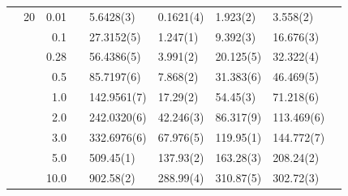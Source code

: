 \begin{table}[H]
\begin{tabularx}{\textwidth}{R{1cm}rrcR{2.3cm}R{2.3cm}R{2.3cm}R{2.3cm}R{1cm}}
		&20 & 0.01 && 5.6428(3) & 0.1621(4) & 1.923(2) & 3.558(2) \\
		&& 0.1 && 27.3152(5) & 1.247(1) & 9.392(3) & 16.676(3) \\
		&& 0.28 && 56.4386(5) & 3.991(2) & 20.125(5) & 32.322(4) \\
		&& 0.5 && 85.7197(6) & 7.868(2) & 31.383(6) & 46.469(5) \\
		&& 1.0 && 142.9561(7) & 17.29(2) & 54.45(3) & 71.218(6) \\
		&& 2.0 && 242.0320(6) & 42.246(3) & 86.317(9) & 113.469(6) \\
		&& 3.0 && 332.6976(6) & 67.976(5) & 119.95(1) & 144.772(7) \\ 
		&& 5.0 && 509.45(1) & 137.93(2) & 163.28(3) & 208.24(2) \\
		&& 10.0 && 902.58(2) & 288.99(4) & 310.87(5) & 302.72(3) \\
		\hline \hline
	\end{tabularx}
\end{table}

